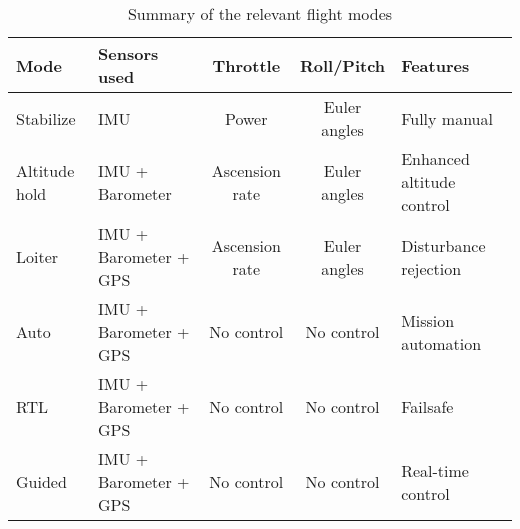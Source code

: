 
\begin{table}[htbp]
\centering
\begin{tabular}{lm{3.1cm}ccm{3cm}} 
	\hline
	\bfseries Mode	& \bfseries Sensors used	& \bfseries Throttle	&	\bfseries Roll/Pitch	&	\bfseries Features	\\
	\hline
	Stabilize		&	IMU					&	Power			&	Euler angles		&	Fully manual			\\
	Altitude hold	&	IMU + Barometer		&	Ascension rate	&	Euler angles		&	Enhanced altitude control\\
	Loiter			&	IMU + Barometer + GPS&	Ascension rate	&	Euler angles		&	Disturbance rejection	\\
	Auto			&	IMU + Barometer + GPS&	No control		&	No control			&	Mission automation		\\
	RTL				&	IMU + Barometer + GPS&	No control		&	No control			&	Failsafe				\\
	Guided			&	IMU + Barometer + GPS&	No control		&	No control			&	Real-time control		\\
	\hline
\end{tabular}
\caption{Summary of the relevant flight modes}
\label{tab:modes}
\end{table}

